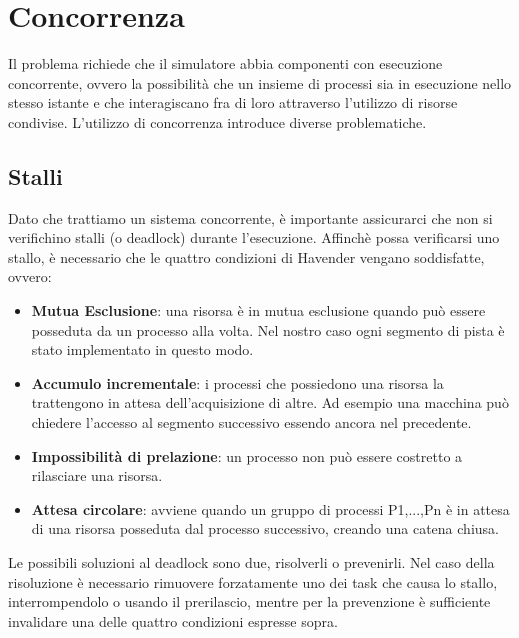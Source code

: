 \section{Concorrenza}
Il problema richiede che il simulatore abbia componenti con esecuzione concorrente, ovvero la possibilità che un insieme di processi sia in esecuzione nello stesso istante e che interagiscano fra di loro attraverso l'utilizzo di risorse condivise.
L'utilizzo di concorrenza introduce diverse problematiche.
 \subsection{Stalli}
 Dato che trattiamo un sistema concorrente, è importante assicurarci che non si verifichino stalli (o deadlock) durante l’esecuzione.
Affinchè possa verificarsi uno stallo, è necessario che le quattro condizioni di Havender vengano soddisfatte, ovvero:
\begin{itemize}
 \item \textbf{Mutua Esclusione}: una risorsa è in mutua esclusione quando può essere posseduta da un processo alla volta. Nel nostro caso ogni segmento di pista è stato implementato in questo modo.
 \item \textbf{Accumulo incrementale}: i processi che possiedono una risorsa la trattengono in attesa dell’acquisizione di altre. Ad esempio una macchina può chiedere l’accesso al segmento successivo essendo ancora nel precedente.
 \item \textbf{Impossibilità di prelazione}: un processo non può essere costretto a rilasciare una risorsa.
 \item \textbf{Attesa circolare}: avviene quando un gruppo di processi P1,...,Pn è in attesa di una risorsa posseduta dal processo successivo, creando una catena chiusa.
\end{itemize}
Le possibili soluzioni al deadlock sono due, risolverli o prevenirli.
Nel caso della risoluzione è necessario rimuovere forzatamente uno dei task che causa lo stallo, interrompendolo o usando il prerilascio, mentre per la prevenzione è sufficiente invalidare una delle quattro condizioni espresse sopra.

